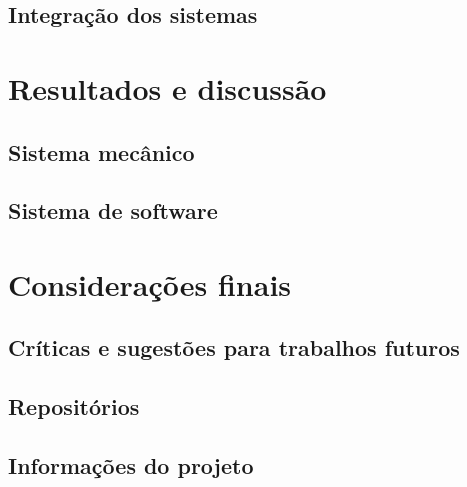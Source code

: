 \documentclass{beamer}
\begin{document}
\subsection{Integração dos sistemas}



\section{Resultados e discussão}

\subsection{Sistema mecânico}


\subsection{Sistema de software}


\section{Considerações finais}
\subsection{Críticas e sugestões para trabalhos futuros}


\subsection{Repositórios}


\subsection{Informações do projeto}

\end{document}
